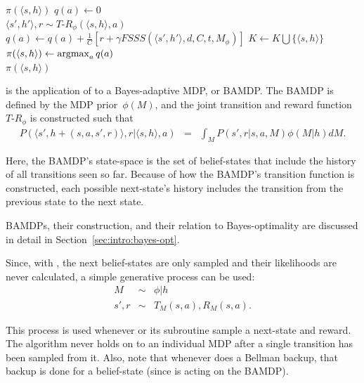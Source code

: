 \begin{algorithm}[tb]
	\caption{$\mbox{BFS3}(s, h, d, C, t, \phi)$}
	\label{alg:bfs3}
	 {
		\Return $\pi(\langle s,h \rangle)$
	}
	 {
		$q(a) \leftarrow 0$\\
		 {
			$\langle s', h'\rangle , r \sim {T\mbox{-}R}_\phi(\langle s,h\rangle, a)$\\
			$q(a) \leftarrow q(a) + \frac 1 C \left[r+ \gamma FSSS(\langle s', h'\rangle, d, C, t, M_\phi)\right]$
		}
	}
	$K \leftarrow K \bigcup \{\langle s,h\rangle\}$\\
	$\pi(\langle s,h\rangle) \leftarrow \argmax_a q(a)$\\
	\Return $\pi(\langle s,h\rangle)$\\
\end{algorithm}


 is the application of  to a Bayes-adaptive MDP, or BAMDP. The BAMDP is defined by the MDP prior~$\phi(M)$, and the joint transition and reward function ${T\mbox{-}R}_\phi$ is constructed such that
\begin{eqnarray*}
P(\langle s', h + (s,a,s',r)\rangle, r | \langle s, h\rangle, a) &=& \int_M P(s', r | s, a, M)\phi(M|h) dM.
\end{eqnarray*}

Here, the BAMDP's state-space is the set of belief-states that include the history of all transitions seen so far. Because of how the BAMDP's transition function is constructed, each possible next-state's history includes the transition from the previous state to the next state.

BAMDPs, their construction, and their relation to Bayes-optimality are discussed in detail in Section~\ref{sec:intro:bayes-opt}.

Since, with , the next belief-states are only sampled and their likelihoods are never calculated, a simple generative process can be used:
\begin{eqnarray}
M &\sim& \phi|h \label{eq:oracle1}\\
s', r &\sim& T_M(s,a), R_M(s,a).\label{eq:oracle2}
\end{eqnarray}

This process is used whenever  or its subroutine  sample a next-state and reward. The algorithm never holds on to an individual MDP after a single transition has been sampled from it. Also, note that whenever  does a Bellman backup, that backup is done for a belief-state (since  is acting on the BAMDP).

